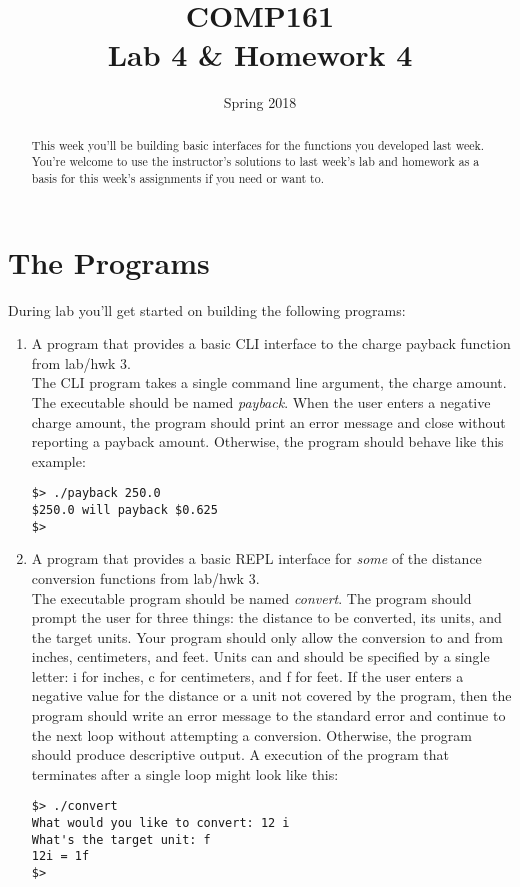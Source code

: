 \documentclass[nobib]{tufte-handout}
\title{COMP161 \\ Lab 4 \& Homework 4}
\author{}
\date{Spring 2018}
\begin{document}
\maketitle
\thispagestyle{empty}

\begin{abstract}
This week you'll be building basic interfaces for the functions you developed last week. You're welcome to use the instructor's solutions to last week's lab and homework as a basis for this week's assignments if you need or want to.
\end{abstract}

\section{The Programs}

During lab you'll get started on building the following programs:
\begin{enumerate}
\item A program that provides a basic CLI interface to the charge payback function from lab/hwk 3. \\
The CLI program takes a single command line argument, the charge amount. The executable should be named \textit{payback}. When the user enters a negative charge amount, the program should print an error message and close without reporting a payback amount. Otherwise, the program should behave like this example:
\begin{verbatim}
$> ./payback 250.0
$250.0 will payback $0.625
$>
\end{verbatim}


\item A program that provides a basic REPL interface for \textit{some} of the distance conversion functions from lab/hwk 3. \\
The executable program should be named \textit{convert}. The program should prompt the user for three things: the distance to be converted, its units, and the target units. Your program should only allow the conversion to and from inches, centimeters, and feet. Units can and should be specified by a single letter: i for inches, c for centimeters, and f for feet. If the user enters a negative value for the distance or a unit not covered by the program, then the program should write an error message to the standard error and continue to the next loop without attempting a conversion. Otherwise, the program should produce descriptive output. A execution of the program that terminates after a single loop might look like this:
\begin{verbatim}
$> ./convert
What would you like to convert: 12 i
What's the target unit: f
12i = 1f
$>
\end{verbatim}
\end{enumerate}
\end{document}
